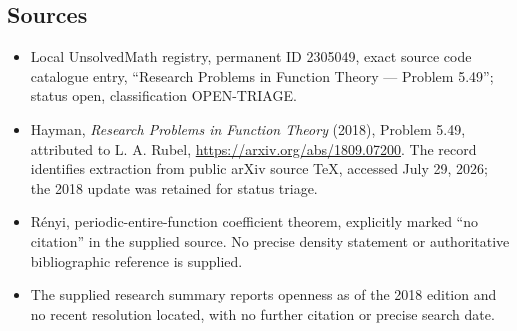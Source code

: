 \documentclass[11pt]{article}
\begin{document}
\subsection{Sources}
\begin{itemize}
\item Local UnsolvedMath registry, permanent ID 2305049, exact source code catalogue entry, ``Research Problems in Function Theory --- Problem 5.49''; status open, classification OPEN-TRIAGE.
\item Hayman, \emph{Research Problems in Function Theory} (2018), Problem 5.49, attributed to L. A. Rubel, \url{https://arxiv.org/abs/1809.07200}. The record identifies extraction from public arXiv source TeX, accessed July 29, 2026; the 2018 update was retained for status triage.
\item R\'enyi, periodic-entire-function coefficient theorem, explicitly marked ``no citation'' in the supplied source. No precise density statement or authoritative bibliographic reference is supplied.
\item The supplied research summary reports openness as of the 2018 edition and no recent resolution located, with no further citation or precise search date.
\end{itemize}
\end{document}
